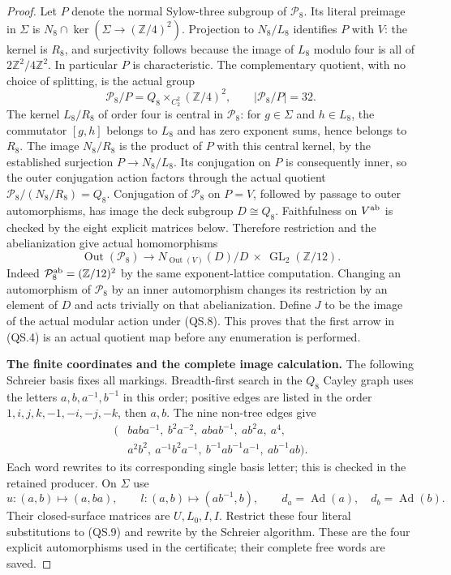 \begin{proof}
Let $P$ denote the normal Sylow-three subgroup of
$\mathcal P_8$.  Its literal preimage in $\Sigma$ is
$N_8\cap\ker(\Sigma\to(\mathbb Z/4)^2)$.
Projection to $N_8/L_8$ identifies $P$ with $V$: the kernel
is $R_8$, and surjectivity follows because the image of $L_8$
modulo four is all of $2\mathbb Z^2/4\mathbb Z^2$.
In particular $P$ is characteristic.  The complementary
quotient, with no choice of splitting, is the actual group
\[
 \mathcal P_8/P
   =Q_8\mathbin{\times}_{C_2^2}(\mathbb Z/4)^2,
 \qquad |\mathcal P_8/P|=32.                              \tag{QS.7}
\]
The kernel $L_8/R_8$ of order four is central in
$\mathcal P_8$: for $g\in\Sigma$ and $h\in L_8$,
the commutator $[g,h]$ belongs to $L_8$ and has zero
exponent sums, hence belongs to $R_8$.  The image
$N_8/R_8$ is the product of $P$ with this central kernel,
by the established surjection $P\to N_8/L_8$.
Its conjugation on $P$ is consequently inner, so the
outer conjugation action factors through the actual
quotient $\mathcal P_8/(N_8/R_8)=Q_8$.
Conjugation of $\mathcal P_8$ on $P=V$, followed by passage to
outer automorphisms, has image the deck subgroup
$D\cong Q_8$.  Faithfulness on $V^{\rm ab}$ is checked by the
eight explicit matrices below.  Therefore restriction and the
abelianization give actual homomorphisms
\[
 \operatorname{Out}(\mathcal P_8)
 \longrightarrow
 N_{\operatorname{Out}(V)}(D)/D
       \ \times\ \operatorname{GL}_2(\mathbb Z/12).
                                                        \tag{QS.8}
\]
Indeed $\mathcal P_8^{\rm ab}=(\mathbb Z/12)^2$ by the same
exponent-lattice computation.  Changing an automorphism of
$\mathcal P_8$ by an inner automorphism changes its restriction
by an element of $D$ and acts trivially on that abelianization.
Define $J$ to be the image of the actual modular action under
(QS.8).  This proves that the first arrow in (QS.4) is an
actual quotient map before any enumeration is performed.

\textbf{The finite coordinates and the complete image calculation.}
The following Schreier basis fixes all markings.  Breadth-first
search in the $Q_8$ Cayley graph uses the letters
$a,b,a^{-1},b^{-1}$ in this order; positive edges are listed in
the order $1,i,j,k,-1,-i,-j,-k$, then $a,b$.  The nine
non-tree edges give
\[
\begin{split}
 (&bab a^{-1},\ b^2a^{-2},\ aba b^{-1},\ ab^2a,\ a^4,\\
  &a^2b^2,\ a^{-1}b^2a^{-1},\ b^{-1}ab^{-1}a^{-1},\
    ab^{-1}ab).
\end{split}                                               \tag{QS.9}
\]
Each word rewrites to its corresponding single basis letter;
this is checked in the retained producer.  On $\Sigma$ use
\[
 u:(a,b)\longmapsto(a,ba),\qquad
 l:(a,b)\longmapsto(ab^{-1},b),\qquad
 d_a=\operatorname{Ad}(a),\quad d_b=\operatorname{Ad}(b).
                                                        \tag{QS.10}
\]
Their closed-surface matrices are $U,L_0,I,I$.  Restrict these
four literal substitutions to (QS.9) and rewrite by the
Schreier algorithm.  These are the four explicit automorphisms
used in the certificate; their complete free words are saved.


\end{proof}
